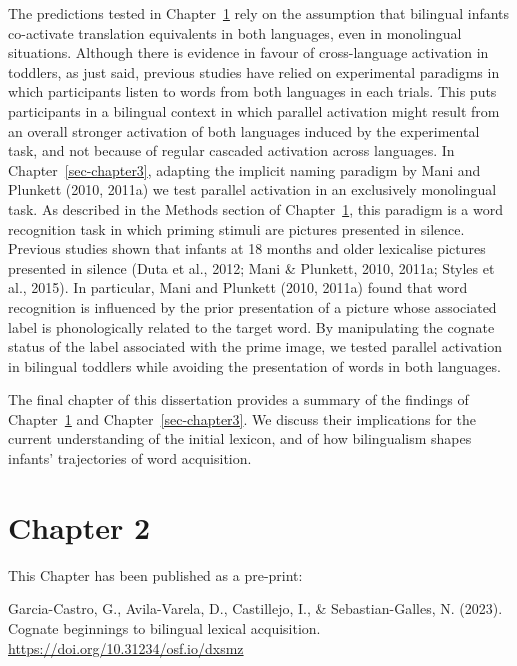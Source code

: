 \documentclass[
  12pt,
  b5paperpaper,
  twoside]{scrreprt}
\begin{document}
The predictions tested in Chapter~\ref{sec-chapter2} rely on the
assumption that bilingual infants co-activate translation equivalents in
both languages, even in monolingual situations. Although there is
evidence in favour of cross-language activation in toddlers, as just
said, previous studies have relied on experimental paradigms in which
participants listen to words from both languages in each trials. This
puts participants in a bilingual context in which parallel activation
might result from an overall stronger activation of both languages
induced by the experimental task, and not because of regular cascaded
activation across languages. In Chapter~\ref{sec-chapter3}, adapting the
implicit naming paradigm by Mani and Plunkett (2010, 2011a) we test
parallel activation in an exclusively monolingual task. As described in
the Methods section of Chapter~\ref{sec-chapter2}, this paradigm is a
word recognition task in which priming stimuli are pictures presented in
silence. Previous studies shown that infants at 18 months and older
lexicalise pictures presented in silence (Duta et al., 2012; Mani \&
Plunkett, 2010, 2011a; Styles et al., 2015). In particular, Mani and
Plunkett (2010, 2011a) found that word recognition is influenced by the
prior presentation of a picture whose associated label is phonologically
related to the target word. By manipulating the cognate status of the
label associated with the prime image, we tested parallel activation in
bilingual toddlers while avoiding the presentation of words in both
languages.

The final chapter of this dissertation provides a summary of the
findings of Chapter~\ref{sec-chapter2} and Chapter~\ref{sec-chapter3}.
We discuss their implications for the current understanding of the
initial lexicon, and of how bilingualism shapes infants' trajectories of
word acquisition.


\hypertarget{sec-chapter2}{%
\chapter{Chapter 2}\label{sec-chapter2}}

\begin{tcolorbox}[enhanced jigsaw, arc=.35mm, breakable, toptitle=1mm, opacityback=0, bottomrule=.15mm, leftrule=.75mm, colbacktitle=quarto-callout-note-color!10!white, colframe=quarto-callout-note-color-frame, left=2mm, coltitle=black, colback=white, bottomtitle=1mm, titlerule=0mm, rightrule=.15mm, title=\textcolor{quarto-callout-note-color}{\faInfo}\hspace{0.5em}{Note}, toprule=.15mm, opacitybacktitle=0.6]

This Chapter has been published as a pre-print:

Garcia-Castro, G., Avila-Varela, D., Castillejo, I., \&
Sebastian-Galles, N. (2023). Cognate beginnings to bilingual lexical
acquisition. \url{https://doi.org/10.31234/osf.io/dxsmz}

\end{tcolorbox}
\end{document}
